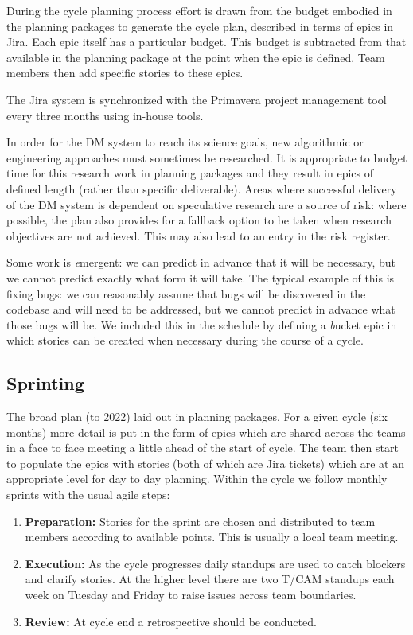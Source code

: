 During the cycle planning process  effort is drawn from the budget embodied in the planning packages to generate the cycle plan, described in terms of epics in Jira.
Each epic itself has a particular budget.
This budget is subtracted from that available in the planning package at the point when the epic is defined.
Team members then add specific stories to these epics.

The Jira system is synchronized with the Primavera project management tool every three months using in-house tools.

In order for the DM system to reach its science goals, new algorithmic or engineering approaches must sometimes be researched.
It is appropriate to budget time for this research work in planning packages and they result in epics of defined length (rather than specific  deliverable).
Areas where successful delivery of the DM system is dependent on speculative research are a source of risk: where possible, the plan  also provides for a fallback option to be taken when research objectives are not achieved.
This may also lead to an entry in the risk register.


Some work is {\emph emergent}: we can predict in advance that it will be necessary, but we cannot
predict exactly what form it will take. The typical example of this is fixing bugs: we can reasonably
assume that bugs will be discovered in the codebase and will need to be addressed,
but we cannot predict in advance what those bugs will be.
We included this in the schedule by defining a {\emph bucket} epic in which stories can be created
when necessary during the course of a cycle.

\subsection{Sprinting} \label{sec:spront} \label{sec:jira_ticket}
The broad plan (to 2022)  laid out in planning packages.
For a  given  cycle (six months)   more detail is put in the form of epics which  are shared across the teams in a face to face meeting a little ahead of the start of cycle.  The team then start to populate the epics with stories (both of which are Jira tickets)  which are at an appropriate level for day to day planning.
Within the cycle we follow monthly sprints with the usual agile steps:
\begin{enumerate}
\item {\bf Preparation:} Stories for the sprint are chosen and distributed to team members according to available points. This is usually a local team meeting.
\item {\bf Execution:} As the cycle progresses daily standups are used to catch blockers and clarify stories. At the higher level there are two T/CAM standups each week on Tuesday and Friday to raise issues across team boundaries.
\item {\bf Review:} At cycle end a retrospective should be conducted.
\end{enumerate}

